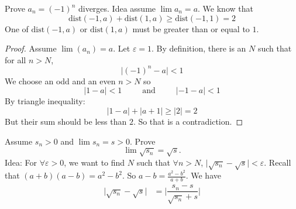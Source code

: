 \documentclass{report}
\begin{document}
\begin{examples}
    \begin{example}
        Prove $a_{n} = (-1)^{n}$ diverges. Idea assume $\lim a_{n} = a$. We know that
            \begin{equation*}
                \text{dist}(-1, a) + \text{dist}(1, a) \geq \text{dist}(-1, 1) = 2
            \end{equation*}
        One of $\text{dist}(-1, a)$ or $\text{dist}(1, a)$ must be greater than or equal to $1$.
            \begin{proof}
                Assume $\lim (a_{n}) = a$. Let $\varepsilon = 1$. By definition, there is an $N$ such that for all $n > N$, 
                    \begin{equation*}
                        \lvert (-1)^{n} - a \rvert < 1
                    \end{equation*}
                We choose an odd and an even $n > N$ so
                    \begin{equation*}
                        \lvert 1 - a \rvert < 1 \hspace{30pt}  \text{and} \hspace{30pt} \lvert -1 - a \rvert  < 1
                    \end{equation*}
                By triangle inequality:
                    \begin{equation*}
                        \lvert 1 - a \rvert + \lvert a + 1 \rvert \geq \lvert 2 \rvert = 2
                    \end{equation*}
                But their sum should be less than $2$. So that is a contradiction.
            \end{proof}
    \end{example}
    \begin{example}
        Assume $s_{n} > 0$ and $\lim s_{n} = s> 0$. Prove 
            \begin{equation*}
                \lim \sqrt{s_{n}} = \sqrt{s}.
            \end{equation*}
        Idea: For $\forall \varepsilon > 0$, we want to find $N$ such that $\forall n > N$, $\lvert \sqrt{s_{n}} - \sqrt{s} \rvert < \varepsilon$. Recall that $(a + b) (a - b) = a^{2} - b^{2}$. So $a - b = \frac{a^{2} - b^{2}}{a + b}$. We have
            \begin{align*}
                \lvert \sqrt{s_{n}} - \sqrt{s} \rvert &= \lvert \dfrac{s_{n} - s}{\sqrt{s_{n}} + s} \rvert \\
            \end{align*}

\end{example}
\end{examples}
\end{document}
